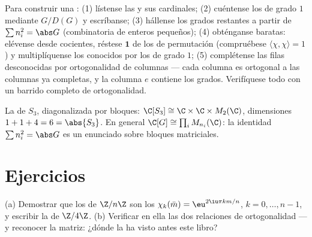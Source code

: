 \begin{method}\label{met:b3:representations:table}
Para construir una : (1) lístense las  y sus cardinales; (2) cuéntense los
 de grado $1$
mediante $G/D(G)$ y escríbanse; (3) hállense los grados restantes a
partir de $\sum n_i^2 = \abs G$ (combinatoria de enteros pequeños); (4)
obténganse  baratas:
elévense desde cocientes, réstese $\mathbf 1$ de los
 de permutación
(compruébese $\langle\chi,\chi\rangle = 1$) y multiplíquense los
 conocidos por los
de grado $1$; (5) complétense las filas desconocidas por ortogonalidad
de columnas --- cada columna es ortogonal a las columnas ya completas, y
la columna $e$ contiene los grados. Verifíquese todo con un barrido
completo de ortogonalidad.
\end{method}

\begin{omfigure}

{\small La  de $S_3$, diagonalizada por bloques:
$\C[S_3] \cong \C \times \C \times M_2(\C)$, dimensiones $1 + 1 +
4 = 6 = \abs{S_3}$. En general $\C[G] \cong \prod_i
M_{n_i}(\C)$: la identidad $\sum n_i^2 = \abs G$ es un enunciado sobre
bloques matriciales.}
\end{omfigure}

\section{Ejercicios}

\begin{exercise}[$\star$]\label{exo:b3:representations:1}
(a) Demostrar que los
 de $\Z/n\Z$ son los
$\chi_k(\bar m) = \eu^{2\iu\pi km/n}$, $k = 0, \dots, n-1$, y escribir
la  de
$\Z/4\Z$. (b) Verificar en ella las dos relaciones de ortogonalidad ---
y reconocer la matriz: ¿dónde la ha visto antes este libro?
\end{exercise}

